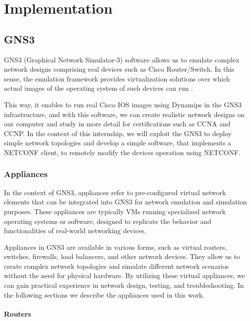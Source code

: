 \chapter{Implementation} \label{chap:impl}

\section{GNS3}

GNS3 (Graphical Network Simulator-3) software allows us to emulate complex network designs comprising real devices such as Cisco Router/Switch. In this sense, the emulation framework provides virtualization solutions over which actual images of the operating system of such devices can run \cite{GNS3}.

This way, it enables to run real Cisco IOS images using Dynamips in the GNS3 infrastructure, and with this software, we can create realistic network designs on our computer and study in more detail for certifications such as \gls{CCNA} and  \gls{CCNP}. In the context of this internship, we will exploit the GNS3 to deploy simple network topologies and develop a simple software, that implements a NETCONF client, to remotely modify the devices operation using NETCONF.


\subsection{Appliances}
In the context of GNS3, appliances refer to pre-configured virtual network elements that can be integrated into GNS3 for network emulation and simulation purposes. These appliances are typically \gls{VMs} running specialized network operating systems or software, designed to replicate the behavior and functionalities of real-world networking devices.

Appliances in GNS3 are available in various forms, such as virtual routers, switches, firewalls, load balancers, and other network devices. They allow us to create complex network topologies and simulate different network scenarios without the need for physical hardware. By utilizing these virtual appliances, we can gain practical experience in network design, testing, and troubleshooting. In the following sections we describe the appliances used in this work.


\subsubsection{Routers}

